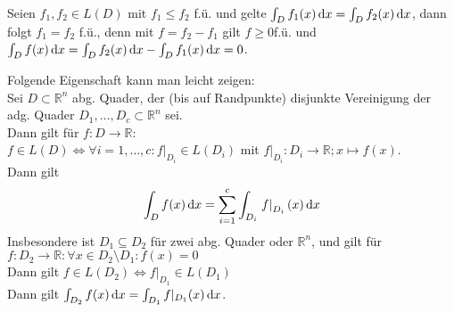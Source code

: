 \begin{folgerung}
	Seien $f_1, f_2\in L(D)$ mit $f_1\leq f_2$ f.ü. und gelte $\int_{D} f_1(x) \,\text{d}x=\int_{D} f_2(x) \,\text{d}x$, dann folgt 
	$f_1=f_2$ f.ü., denn mit $f=f_2-f_1$ gilt $f\geq 0$f.ü. und $\int_{D} f(x) \,\text{d}x=\int_{D} f_2(x) \,\text{d}x-\int_{D} f_1(x) \,\text{d}x=0$.
\end{folgerung}
\begin{remark}
	Folgende Eigenschaft kann man leicht zeigen: \\
	Sei $D\subset\mathbb{R}^n$ abg. Quader, der (bis auf Randpunkte) disjunkte Vereinigung der adg. Quader $D_1, \dots, D_c\subset\mathbb{R}^n$ sei. \\
	Dann gilt für $f\colon D\to\mathbb{R}$: \\
	$f\in L(D)\iff\forall i=1,\dots, c\colon \left. f\right|_{D_i}\in L(D_i)$ mit $\left. f\right|_{D_i}\colon D_i\to\mathbb{R};x\mapsto f(x)$.\\
	Dann gilt
	\[
		\int_{D} f(x) \,\text{d}x = \sum_{i=1}^c\int_{D_i} \left. f\right|_{D_i}(x) \,\text{d}x
	\]
	Insbesondere ist $D_1\subseteq D_2$ für zwei abg. Quader oder $\mathbb{R}^n$, und gilt für $f\colon D_2\to\mathbb{R}\colon\forall x\in D_2\setminus D_1:f(x)=0$\\
	Dann gilt $f\in L(D_2)\iff f|_{D_1}\in L(D_1)$\\
	Dann gilt $\int_{D_2} f(x) \,\text{d}x = \int_{D_1} f|_{D_1}(x) \,\text{d}x$.
\end{remark}